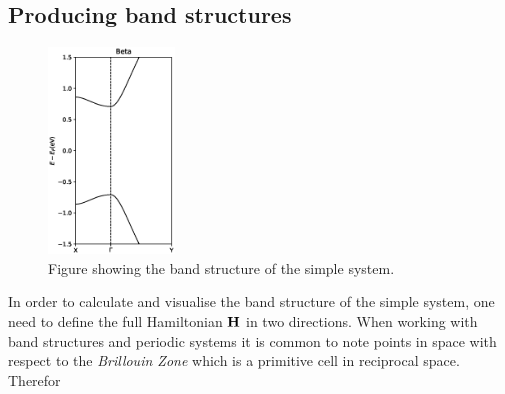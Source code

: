 \subsection{Producing band structures}
\begin{figure}
	\vspace{-2em}
	\includegraphics[width=0.30\textwidth]{Figures/BetaBandstructures.eps}
	\caption{Figure showing the band structure of the simple system.}\label{bandssimple}
\end{figure}
In order to calculate and visualise the band structure of the simple system, one need to define the full Hamiltonian \(\vb{H}\) in two directions. When working with band structures and periodic systems it is common to note points in space with respect to the \textit{Brillouin Zone} which is a primitive cell in reciprocal space. Therefor
